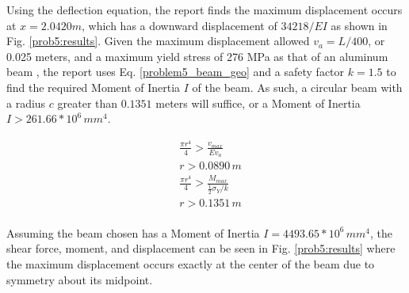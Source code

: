 \documentclass[a4paper]{article}
\begin{document}
Using the deflection equation, the report finds the maximum displacement occurs at $x = 2.0420 m$, which has a downward displacement of $34218/EI$ as shown in Fig. \ref{prob5:results}. Given the maximum displacement allowed $v_a = L/400$, or 0.025 meters, and a maximum yield stress of 276 MPa as that of an aluminum beam , the report uses Eq. \ref{problem5_beam_geo} and a safety factor $k=1.5$ to find the required Moment of Inertia $I$ of the beam. As such, a circular beam with a radius $c$ greater than $0.1351$ meters will suffice, or a Moment of Inertia $I > 261.66 * 10^6\,{mm}^4$.

\begin{equation}
\begin{split}
& \frac{\pi r^4}{4} > \frac{v_{max}}{Ev_a} \\
& r > 0.0890\,m \\
& \frac{\pi r^4}{4} > \frac{M_{max}}{\frac{1}{2}\sigma_Y/ k}\\
& r > 0.1351\,m \\
\end{split}
\label{problem5_beam_geo}
\end{equation}

Assuming the beam chosen has a Moment of Inertia $I = 4493.65 * 10^6\,{mm}^4$, the shear force, moment, and displacement can be seen in Fig. \ref{prob5:results} where the maximum displacement occurs exactly at the center of the beam due to symmetry about its midpoint.
\end{document}
